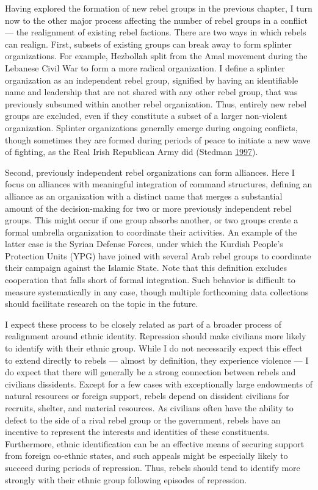 \documentclass[12pt,]{book}
\theoremstyle{definition}
\theoremstyle{definition}
\theoremstyle{definition}
\theoremstyle{remark}
\begin{document}
Having explored the formation of new rebel groups in the previous
chapter, I turn now to the other major process affecting the number of
rebel groups in a conflict --- the realignment of existing rebel
factions. There are two ways in which rebels can realign. First, subsets
of existing groups can break away to form splinter organizations. For
example, Hezbollah split from the Amal movement during the Lebanese
Civil War to form a more radical organization. I define a splinter
organization as an independent rebel group, signified by having an
identifiable name and leadership that are not shared with any other
rebel group, that was previously subsumed within another rebel
organization. Thus, entirely new rebel groups are excluded, even if they
constitute a subset of a larger non-violent organization. Splinter
organizations generally emerge during ongoing conflicts, though
sometimes they are formed during periods of peace to initiate a new wave
of fighting, as the Real Irish Republican Army did (Stedman
\protect\hyperlink{ref-Stedman1997}{1997}).

Second, previously independent rebel organizations can form alliances.
Here I focus on alliances with meaningful integration of command
structures, defining an alliance as an organization with a distinct name
that merges a substantial amount of the decision-making for two or more
previously independent rebel groups. This might occur if one group
absorbs another, or two groups create a formal umbrella organization to
coordinate their activities. An example of the latter case is the Syrian
Defense Forces, under which the Kurdish People's Protection Units (YPG)
have joined with several Arab rebel groups to coordinate their campaign
against the Islamic State. Note that this definition excludes
cooperation that falls short of formal integration. Such behavior is
difficult to measure systematically in any case, though multiple
forthcoming data collections should facilitate research on the topic in
the future.

I expect these process to be closely related as part of a broader
process of realignment around ethnic identity. Repression should make
civilians more likely to identify with their ethnic group. While I do
not necessarily expect this effect to extend directly to rebels ---
almost by definition, they experience violence --- I do expect that
there will generally be a strong connection between rebels and civilians
dissidents. Except for a few cases with exceptionally large endowments
of natural resources or foreign support, rebels depend on dissident
civilians for recruits, shelter, and material resources. As civilians
often have the ability to defect to the side of a rival rebel group or
the government, rebels have an incentive to represent the interests and
identities of these constituents. Furthermore, ethnic identification can
be an effective means of securing support from foreign co-ethnic states,
and such appeals might be especially likely to succeed during periods of
repression. Thus, rebels should tend to identify more strongly with
their ethnic group following episodes of repression.
\end{document}

